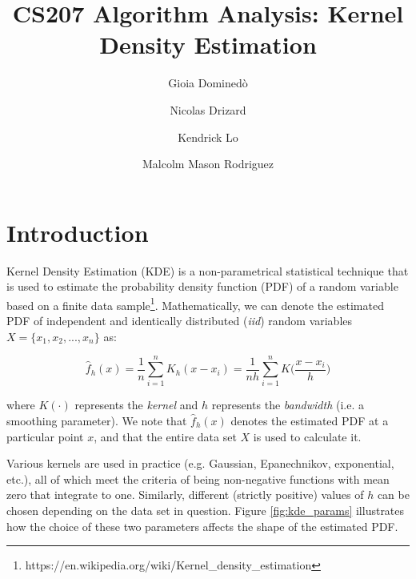 \documentclass[11pt]{article}
\title{CS207 Algorithm Analysis: Kernel Density Estimation}
\author{Gioia Domined\`o \and Nicolas Drizard \and Kendrick Lo \and Malcolm Mason Rodriguez}
\begin{document}
\maketitle{}

\pagestyle{plain}

\section{Introduction}

Kernel Density Estimation (KDE) is a non-parametrical statistical technique that is used to estimate the probability density function (PDF) of a random variable based on a finite data sample\footnote{https://en.wikipedia.org/wiki/Kernel\_density\_estimation}.  Mathematically, we can denote the estimated PDF of independent and identically distributed (\textit{iid}) random variables $X=\{x_1, x_2, ..., x_n\}$ as:

\begin{equation} \label{eq:kde}
\hat{f}_h(x) = \frac{1}{n} \sum_{i=1}^n K_h(x - x_i) = \frac{1}{nh} \sum_{i=1}^n K \Big( \frac{x - x_i}{h} \Big)
\end{equation}

\noindent where $K(\cdot)$ represents the \textit{kernel} and $h$ represents the \textit{bandwidth} (i.e. a smoothing parameter). We note that $\hat{f}_h(x)$ denotes the estimated PDF at a particular point $x$, and that the entire data set $X$ is used to calculate it. \medskip

\noindent Various kernels are used in practice (e.g. Gaussian, Epanechnikov, exponential, etc.), all of which meet the criteria of being non-negative functions with mean zero that integrate to one. Similarly, different (strictly positive) values of $h$ can be chosen depending on the data set in question. Figure \ref{fig:kde_params} illustrates how the choice of these two parameters affects the shape of the estimated PDF.
\end{document}
